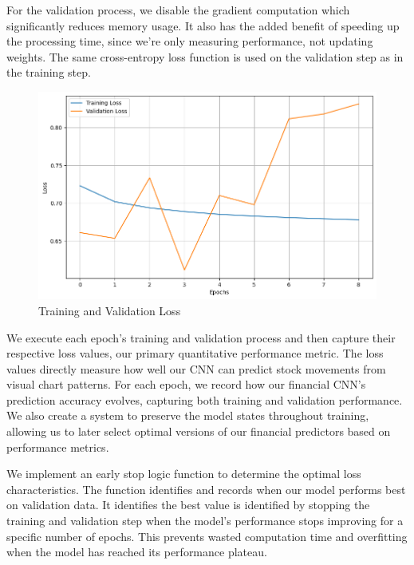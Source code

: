 \documentclass[12pt]{article}
\begin{document}
For the validation process, we disable the gradient computation which significantly reduces memory usage. It also has the added benefit of speeding up the processing time, since we're only measuring performance, not updating weights. The same cross-entropy loss function is used on the validation step as in the training step.


\begin{figure}[h]
	\centering
	\includegraphics[width=.65\linewidth]{plots/training_validation.png}
	\caption{Training and Validation Loss}
	\label{fig:epoch_loss}
\end{figure}

We execute each epoch's training and validation process and then capture their respective loss values, our primary quantitative performance metric. The loss values directly measure how well our CNN can predict stock movements from visual chart patterns. For each epoch, we record how our financial CNN's prediction accuracy evolves, capturing both training and validation performance. We also create a system to preserve the model states throughout training, allowing us to later select optimal versions of our financial predictors based on performance metrics.

We implement an early stop logic function to determine the optimal loss characteristics. The function identifies and records when our model performs best on validation data. It identifies the best value is identified by stopping the training and validation step when the model's performance stops improving for a specific number of epochs. This prevents wasted computation time and overfitting when the model has reached its performance plateau.
\end{document}
